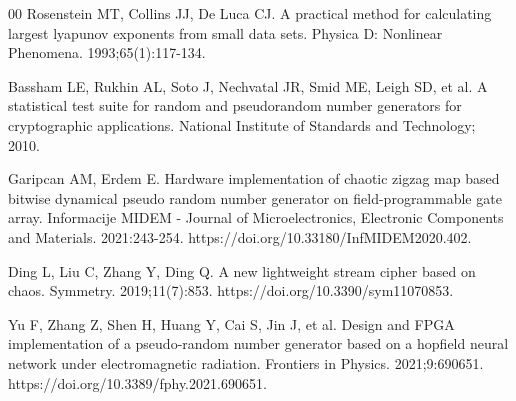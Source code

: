 \documentclass[preprint,12pt]{elsarticle}
\begin{document}
\begin{thebibliography}{00}
Rosenstein MT, Collins JJ, De Luca CJ. A practical method for calculating largest lyapunov exponents from small data sets. Physica D: Nonlinear Phenomena. 1993;65(1):117-134.

Bassham LE, Rukhin AL, Soto J, Nechvatal JR, Smid ME, Leigh SD, et al. A statistical test suite for random and pseudorandom number generators for cryptographic applications. National Institute of Standards and Technology; 2010.

Garipcan AM, Erdem E. Hardware implementation of chaotic zigzag map based bitwise dynamical pseudo random number generator on field-programmable gate array. Informacije MIDEM - Journal of Microelectronics, Electronic Components and Materials. 2021:243-254. https://doi.org/10.33180/InfMIDEM2020.402.

Ding L, Liu C, Zhang Y, Ding Q. A new lightweight stream cipher based on chaos. Symmetry. 2019;11(7):853. https://doi.org/10.3390/sym11070853.

Yu F, Zhang Z, Shen H, Huang Y, Cai S, Jin J, et al. Design and FPGA implementation of a pseudo-random number generator based on a hopfield neural network under electromagnetic radiation. Frontiers in Physics. 2021;9:690651. https://doi.org/10.3389/fphy.2021.690651.


\end{thebibliography}
\end{document}
